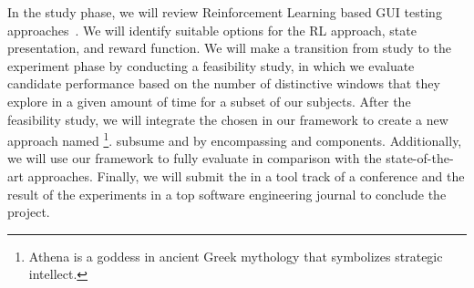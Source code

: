 \bigskip
\noindent
In the study phase, we will review Reinforcement Learning based  GUI testing approaches~\cite{Mariani:GUI:STVR:2014,Vuong:RLTest:A-Test:2018,Pan:QTesting:ISSTA:2020,Romdhana:ARES:TOSEM:2022}. 
We will identify suitable options for the RL approach, state presentation, and reward function.
We will make a transition from study to the experiment phase by  conducting a feasibility study, in which we evaluate candidate \rlaganets performance based on the number of distinctive windows that they explore in a given amount of time for a subset of our subjects. 
After the feasibility study, we will  integrate the chosen \rlaganet in our framework to create a new \testreuse approach named \rltool\footnote{Athena is a goddess in ancient Greek mythology that symbolizes strategic intellect.
}.
\rltool subsume \visiontool and \llmtool by  encompassing \imagelabeler and \llmtranslator components.
Additionally, we will use our \tme framework to fully evaluate \rltool in comparison with the state-of-the-art \testreuse approaches.
Finally, we will submit the \rltool in a tool track of a conference and the result of the \testreuse experiments in a top software  engineering journal to conclude the project. 
















